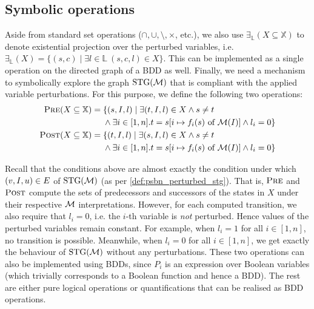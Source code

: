 \subsection{Symbolic operations}
\label{subsec:symbolic_ops}

Aside from standard set operations ($\cap, \cup, \setminus, \times$, etc.), we also use $\exists_{\mathbb{L}}(X \subseteq \mathbb{X})$ to denote existential projection over the perturbed variables, i.e. $\exists_{\mathbb{L}}(X) = \{ (s, c) \mid \exists l \in \mathbb{L}~(s, c, l) \in X \}$. This can be implemented as a single operation on the directed graph of a BDD as well. Finally, we need a mechanism to symbolically explore the graph $\text{\upshape STG}(\mathcal{M})$ that is compliant with the applied variable perturbations. For this purpose, we define the following two operations:
\begin{align*}
      \textsc{Pre}(X \subseteq \mathbb{X}) =\; &\{ (s, I, l) \mid \exists (t, I, l) \in X \land s \not= t \\ &\land \exists i \in [1,n].t = s[i \mapsto f_i(s) \text{ of } \mathcal{M}(I)] \land  l_i = 0 \}\\
      \textsc{Post}(X \subseteq \mathbb{X}) =\; &\{ (t, I, l) \mid \exists (s, I, l) \in X \land s \not= t \\ &\land \exists i \in [1,n].t = s[i \mapsto f_i(s) \text{ of } \mathcal{M}(I)] \land l_i = 0 \}  
\end{align*}

Recall that the conditions above are almost exactly the condition under which $(v, I, u) \in E$ of $\text{\upshape STG}(\mathcal{M})$ (as per \autoref{def:psbn_perturbed_stg}). That is, $\textsc{Pre}$ and $\textsc{Post}$ compute the sets of predecessors and successors of the states in $X$ under their respective $\mathcal{M}$ interpretations. However, for each computed transition, we also require that $l_i = 0$, i.e. the $i$-th variable is \emph{not} perturbed. Hence values of the perturbed variables remain constant. For example, when $l_i = 1$ for all $i \in [1,n]$, no transition is possible. Meanwhile, when $l_i = 0$ for all $i \in [1,n]$, we get exactly the behaviour of $\text{\upshape STG}(\mathcal{M})$ without any perturbations. These two operations can also be implemented using BDDs, since $P_i$ is an expression over Boolean variables (which trivially corresponds to a Boolean function and hence a BDD). The rest are either pure logical operations or quantifications that can be realised as BDD operations.

